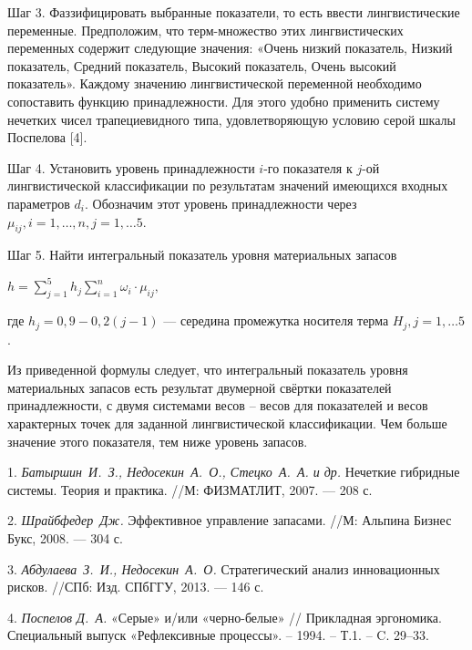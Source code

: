 Шаг 3.
Фаззифицировать выбранные показатели, то есть ввести лингвистические переменные. 
Предположим, что терм-множество этих лингвистических переменных содержит следующие значения: «Очень низкий показатель, Низкий показатель, Средний показатель, Высокий показатель, Очень высокий показатель». Каждому значению лингвистической переменной необходимо сопоставить функцию принадлежности. Для этого удобно применить систему нечетких чисел трапециевидного типа, удовлетворяющую условию серой шкалы Поспелова [4]. 

Шаг 4.
Установить уровень принадлежности $i$-го показателя к $j$-ой лингвистической классификации по результатам значений имеющихся входных параметров $d_{i}$. Обозначим этот уровень принадлежности через $\mu_{ij}, i = 1, \ldots, n,  j = 1, \ldots 5$.

Шаг 5.
Найти интегральный показатель уровня материальных запасов
\begin{center}
$ h = \sum_{j = 1}^{5} h_{j} \sum_{i = 1}^{n} \omega_{i} \cdot \mu_{ij},$
\end{center}
где $h_{j} = 0,9 - 0,2(j - 1)$ --- середина промежутка носителя терма $H_{j}, j = 1, \ldots 5$.

Из приведенной формулы следует, что  интегральный показатель уровня материальных запасов есть результат двумерной свёртки показателей принадлежности, с двумя системами весов – весов для показателей и весов характерных точек для заданной  лингвистической классификации. Чем больше значение этого показателя, тем ниже уровень запасов.



\litlist

1. {\it Батыршин~И.~З., Недосекин~А.~О., Стецко~А.~А. и др.} Нечеткие гибридные системы. Теория и
практика. //М: ФИЗМАТЛИТ, 2007. — 208 с.

2. {\it Шрайбфедер~Дж.} Эффективное управление запасами. //М: Альпина Бизнес Букс, 2008. — 304 с.

3. {\it Абдулаева~З.~И., Недосекин~А.~О.} Стратегический анализ инновационных рисков. //СПб: Изд. СПбГГУ, 2013. — 146 с.

4. {\it Поспелов Д.~А.} «Серые» и/или «черно-белые» // Прикладная эргономика. Специальный выпуск  «Рефлексивные процессы». – 1994. – Т.1. – C. 29–33. 
